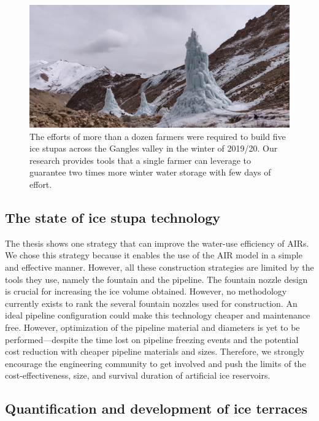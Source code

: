 \begin{figure}[htb]
	\includegraphics[width=\textwidth]{figs/icestupa_valley}

  \caption{The efforts of more than a dozen farmers were required to build five ice stupas across the Gangles
  valley in the winter of 2019/20. Our research provides tools that a single farmer can leverage to guarantee
  two times more winter water storage with few days of effort.}

	\label{fig:icestupa_valley}
\end{figure}

\subsection{The state of ice stupa technology}

The thesis shows one strategy that can improve the water-use efficiency of AIRs. We chose this strategy because
it enables the use of the AIR model in a simple and effective manner. However, all these construction strategies
are limited by the tools they use, namely the fountain and the pipeline. The fountain nozzle design is crucial
for increasing the ice volume obtained. However, no methodology currently exists to rank the several fountain
nozzles used for construction. An ideal pipeline configuration could make this technology cheaper and
maintenance free. However, optimization of the pipeline material and diameters is yet to be performed---despite
the time lost on pipeline freezing events and the potential cost reduction with cheaper pipeline materials and
sizes. Therefore, we strongly encourage the engineering community to get involved and push the limits of the
cost-effectiveness, size, and survival duration of artificial ice reservoirs.

\subsection{Quantification and development of ice terraces}

